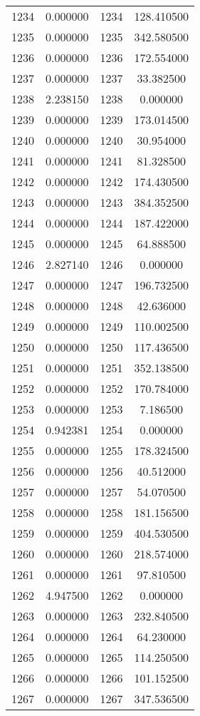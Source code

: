 \documentclass[12pt]{article}
\begin{document}
\begin{longtable}{@{}cccc@{}}
1234 & 0.000000 & 1234 & 128.410500 \\
1235 & 0.000000 & 1235 & 342.580500 \\
1236 & 0.000000 & 1236 & 172.554000 \\
1237 & 0.000000 & 1237 & 33.382500 \\
1238 & 2.238150 & 1238 & 0.000000 \\
1239 & 0.000000 & 1239 & 173.014500 \\
1240 & 0.000000 & 1240 & 30.954000 \\
1241 & 0.000000 & 1241 & 81.328500 \\
1242 & 0.000000 & 1242 & 174.430500 \\
1243 & 0.000000 & 1243 & 384.352500 \\
1244 & 0.000000 & 1244 & 187.422000 \\
1245 & 0.000000 & 1245 & 64.888500 \\
1246 & 2.827140 & 1246 & 0.000000 \\
1247 & 0.000000 & 1247 & 196.732500 \\
1248 & 0.000000 & 1248 & 42.636000 \\
1249 & 0.000000 & 1249 & 110.002500 \\
1250 & 0.000000 & 1250 & 117.436500 \\
1251 & 0.000000 & 1251 & 352.138500 \\
1252 & 0.000000 & 1252 & 170.784000 \\
1253 & 0.000000 & 1253 & 7.186500 \\
1254 & 0.942381 & 1254 & 0.000000 \\
1255 & 0.000000 & 1255 & 178.324500 \\
1256 & 0.000000 & 1256 & 40.512000 \\
1257 & 0.000000 & 1257 & 54.070500 \\
1258 & 0.000000 & 1258 & 181.156500 \\
1259 & 0.000000 & 1259 & 404.530500 \\
1260 & 0.000000 & 1260 & 218.574000 \\
1261 & 0.000000 & 1261 & 97.810500 \\
1262 & 4.947500 & 1262 & 0.000000 \\
1263 & 0.000000 & 1263 & 232.840500 \\
1264 & 0.000000 & 1264 & 64.230000 \\
1265 & 0.000000 & 1265 & 114.250500 \\
1266 & 0.000000 & 1266 & 101.152500 \\
1267 & 0.000000 & 1267 & 347.536500 \\

\end{longtable}
\end{document}

